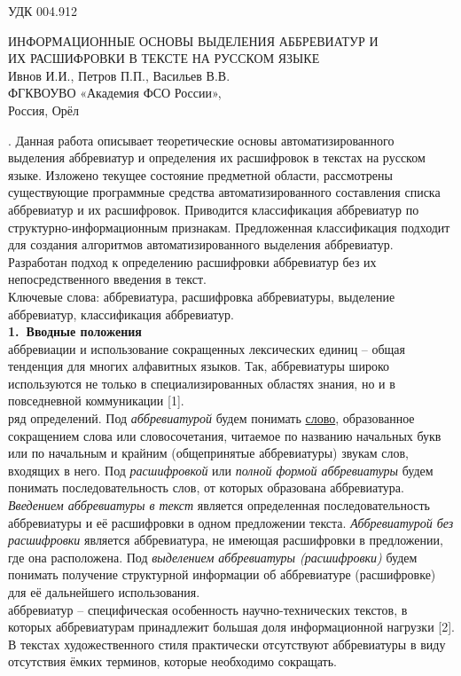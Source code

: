 \documentclass[a4paper, 12pt]{article}
\begin{document}
УДК 004.912
\begin{center}
    ИНФОРМАЦИОННЫЕ ОСНОВЫ ВЫДЕЛЕНИЯ АББРЕВИАТУР И\\ ИХ РАСШИФРОВКИ В ТЕКСТЕ НА РУССКОМ ЯЗЫКЕ\\
Ивнов И.И., Петров П.П., Васильев В.В.\\
ФГКВОУВО «Академия ФСО России»,\\
Россия, Орёл
\end{center}
. Данная работа описывает теоретические основы автоматизированного выделения аббревиатур и определения их расшифровок в текстах на русском языке. Изложено текущее состояние предметной области, рассмотрены существующие программные средства автоматизированного составления списка аббревиатур и их расшифровок. Приводится классификация аббревиатур по структурно-информационным признакам. Предложенная классификация подходит для создания алгоритмов автоматизированного выделения аббревиатур. Разработан подход к определению расшифровки аббревиатур без их непосредственного введения в текст.\\
\indent Ключевые слова: аббревиатура, расшифровка аббревиатуры, выделение аббревиатур, классификация аббревиатур.\\
\indent\textbf{1. Вводные положения}\\
 аббревиации и использование сокращенных лексических единиц – общая тенденция для многих алфавитных языков. Так, аббревиатуры широко используются не только в специализированных областях знания, но и в повседневной коммуникации [1].\\ 
 ряд определений. Под \textit{аббревиатурой} будем понимать \href{https://ru.wikipedia.org/wiki/%D0%A1%D0%BB%D0%BE%D0%B2%D0%BE}{слово}, образованное сокращением слова или словосочетания, читаемое по названию начальных букв или по начальным и крайним (общепринятые аббревиатуры) звукам слов, входящих в него. Под \textit{расшифровкой} или \textit{полной формой аббревиатуры} будем понимать последовательность слов, от которых образована аббревиатура. \textit{Введением аббревиатуры в текст} является определенная последовательность аббревиатуры и её расшифровки в одном предложении текста. \textit{Аббревиатурой без расшифровки} является аббревиатура, не имеющая расшифровки в предложении, где она расположена. Под \textit{выделением аббревиатуры (расшифровки)} будем понимать получение структурной информации об аббревиатуре (расшифровке) для её дальнейшего использования.\\
 аббревиатур – специфическая особенность научно-технических текстов, в которых аббревиатурам принадлежит большая доля информационной нагрузки [2]. В текстах художественного стиля практически отсутствуют аббревиатуры в виду отсутствия ёмких терминов, которые необходимо сокращать.
\end{document}
